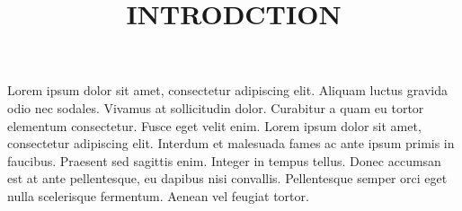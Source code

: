 
\chapter[Chapter 1]{}
\begin{center}
\title{\textup{\textbf{\large{INTRODCTION}}}}
\end{center}
\textup{Lorem ipsum dolor sit amet, consectetur adipiscing elit. Aliquam luctus gravida odio nec sodales. Vivamus at sollicitudin dolor. Curabitur a quam eu tortor elementum consectetur. Fusce eget velit enim. Lorem ipsum dolor sit amet, consectetur adipiscing elit. Interdum et malesuada fames ac ante ipsum primis in faucibus. Praesent sed sagittis enim. Integer in tempus tellus. Donec accumsan est at ante pellentesque, eu dapibus nisi convallis. Pellentesque semper orci eget nulla scelerisque fermentum. Aenean vel feugiat tortor.}

